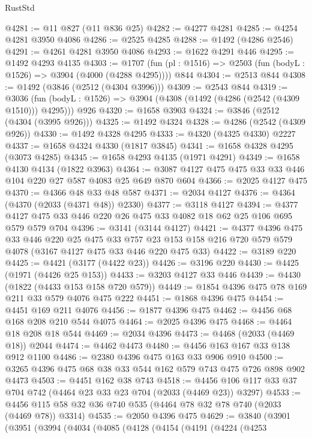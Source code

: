 \begin{lexlean}{RustStd}
\begin{coremodule}
{\begin{coremodule}
{{{{{{{{{{{{{@4281 := @11 @827 (@11 @836 @25)
@4282 := @4277 @4281
@4285 := @4254 @4281 @3950 @4086
@4286 := @2525 @4285
@4288 := @1492 (@4286 @2546)
@4291 := @4261 @4281 @3950 @4086
@4293 := @1622 @4291 @446
@4295 := @1492 @4293 @4135
@4303 := @1707 (fun (pl : @1516) => @2503 (fun (bodyL : @1526) => @3904 (@4000 (@4288 @4295)))) @844
@4304 := @2513 @844
@4308 := @1492 (@3846 (@2512 (@4304 @3996)))
@4309 := @2543 @844
@4319 := @3036
    (fun (bodyL : @1526) => @3904 (@4308 (@1492 (@4286 (@2542 (@4309 @1510))) @4295)))
    @926
@4320 := @1658 @3903
@4324 := @3846 (@2512 (@4304 (@3995 @926)))
@4325 := @1492 @4324
@4328 := @4286 (@2542 (@4309 @926))
@4330 := @1492 @4328 @4295
@4333 := @4320 (@4325 @4330) @2227
@4337 := @1658 @4324 @4330 (@1817 @3845)
@4341 := @1658 @4328 @4295 (@3073 @4285)
@4345 := @1658 @4293 @4135 (@1971 @4291)
@4349 := @1658 @4130 @4134 (@1822 @3963)
@4364 := @3087 @4127 @475 @475 @33 @33 @446 @104 @220 @27 @587 @4083 @25 @649 @870 @604
@4366 := @2025 @4127 @475
@4370 := @4366 @48 @33 @48 @587
@4371 := @2034 @4127
@4376 := @4364 (@4370 (@2033 (@4371 @48)) @2330)
@4377 := @3118 @4127
@4394 := @4377 @4127 @475 @33 @446 @220 @26 @475 @33 @4082 @18 @62 @25 @106 @695 @579 @579 @704
@4396 := @3141 (@3144 @4127)
@4421 := @4377
    @4396
    @475
    @33
    @446
    @220
    @25
    @475
    @33
    @757
    @23
    @153
    @158
    @216
    @720
    @579
    @579
    @4078
    (@3167 @4127 @475 @33 @446 @220 @475 @33)
@4422 := @3189 @220
@4425 := @4421 (@3177 (@4422 @23))
@4426 := @3196 @220
@4430 := @4425 (@1971 (@4426 @25 @153))
@4433 := @3203 @4127 @33 @446
@4439 := @4430 (@1822 (@4433 @153 @158 @720 @579))
@4449 := @1854 @4396 @475 @78 @169 @211 @33 @579 @4076 @475 @222
@4451 := @1868 @4396 @475
@4454 := @4451 @169 @211 @4076
@4456 := @1877 @4396 @475
@4462 := @4456 @68 @168 @208 @210 @544 @4075
@4464 := @2025 @4396 @475
@4468 := @4464 @18 @208 @18 @544
@4469 := @2034 @4396
@4473 := @4468 (@2033 (@4469 @18)) @2044
@4474 := @4462 @4473
@4480 := @4456 @163 @167 @33 @138 @912 @1100
@4486 := @2380 @4396 @475 @163 @33 @906 @910
@4500 := @3265 @4396 @475 @68 @38 @33 @544 @162 @579 @743 @475 @726 @898 @902 @4473
@4503 := @4451 @162 @38 @743
@4518 := @4456 @106 @117 @33 @37 @704 @742 (@4464 @23 @33 @23 @704 (@2033 (@4469 @23)) @3297)
@4533 := @4456 @115 @58 @32 @36 @740 @535 (@4464 @78 @32 @78 @740 (@2033 (@4469 @78)) @3314)
@4535 := @2050 @4396 @475
@4629 := @3840
    (@3901
      (@3951
        (@3994
          (@4034
            (@4085
              (@4128
                (@4154
                  (@4191
                    (@4224
                      (@4253
}}}}}}}}}}}}}
\end{coremodule}}
\end{coremodule}
\end{lexlean}
